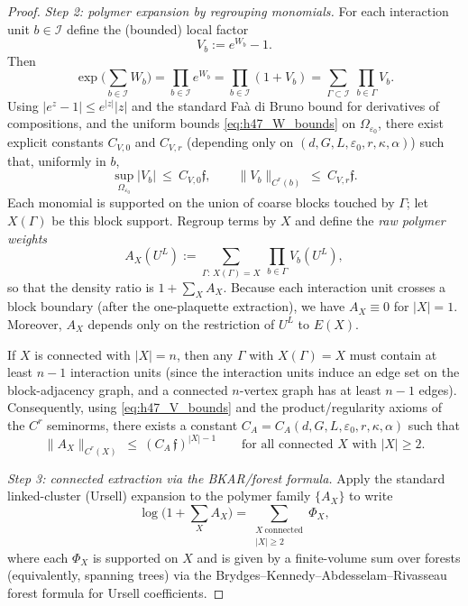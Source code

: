 \begin{proof}
\emph{Step 2: polymer expansion by regrouping monomials.}
For each interaction unit $b\in\mathscr I$ define the (bounded) local factor
\[
V_b := e^{W_b}-1.
\]
Then
\[
\exp\Big(\sum_{b\in\mathscr I} W_b\Big)
=\prod_{b\in\mathscr I} e^{W_b}
=\prod_{b\in\mathscr I} (1+V_b)
=\sum_{\Gamma\subset\mathscr I}\ \prod_{b\in\Gamma} V_b.
\]
Using $|e^z-1|\le e^{|z|}|z|$ and the standard Fa\`a di Bruno bound for derivatives of compositions, and the
uniform bounds \eqref{eq:h47_W_bounds} on $\Omega_{\varepsilon_0}$, there exist explicit constants
$C_{V,0}$ and $C_{V,r}$ (depending only on $(d,G,L,\varepsilon_0,r,\kappa,\alpha)$) such that, uniformly in $b$,
\begin{equation}\label{eq:h47_V_bounds}
\sup_{\Omega_{\varepsilon_0}} |V_b|\ \le\ C_{V,0}\mathfrak f,
\qquad
\|V_b\|_{C^r(b)}\ \le\ C_{V,r}\mathfrak f.
\end{equation}
Each monomial is supported on the union of coarse blocks touched by $\Gamma$; let $X(\Gamma)$ be this block support.
Regroup terms by $X$ and define the \emph{raw polymer weights}
\begin{equation}\label{eq:h47_raw_polymer}
A_X(U^L):=\sum_{\Gamma:\,X(\Gamma)=X}\ \prod_{b\in\Gamma} V_b(U^L),
\end{equation}
so that the density ratio is $1+\sum_X A_X$.
Because each interaction unit crosses a block boundary (after the one-plaquette extraction), we have $A_X\equiv 0$ for $|X|=1$.
Moreover, $A_X$ depends only on the restriction of $U^L$ to $E(X)$.

If $X$ is connected with $|X|=n$, then any $\Gamma$ with $X(\Gamma)=X$ must contain at least $n-1$ interaction units
(since the interaction units induce an edge set on the block-adjacency graph, and a connected $n$-vertex graph has at least $n-1$ edges).
Consequently, using \eqref{eq:h47_V_bounds} and the product/regularity axioms of the $C^r$ seminorms, there exists a constant
$C_A=C_A(d,G,L,\varepsilon_0,r,\kappa,\alpha)$ such that
\begin{equation}\label{eq:h47_A_bound}
\|A_X\|_{C^r(X)}\ \le\ (C_A\,\mathfrak f)^{|X|-1}
\qquad\text{for all connected }X\text{ with }|X|\ge 2.
\end{equation}


\emph{Step 3: connected extraction via the BKAR/forest formula.}
Apply the standard linked-cluster (Ursell) expansion to the polymer family $\{A_X\}$ to write
\begin{equation}\label{eq:h47_linked_cluster}
\log\Big(1+\sum_X A_X\Big)
=\sum_{\substack{X\ \mathrm{connected}\\ |X|\ge 2}} \Phi_X,
\end{equation}
where each $\Phi_X$ is supported on $X$ and is given by a finite-volume sum over forests (equivalently, spanning trees) via the
Brydges--Kennedy--Abdesselam--Rivasseau forest formula for Ursell coefficients.


\end{proof}
